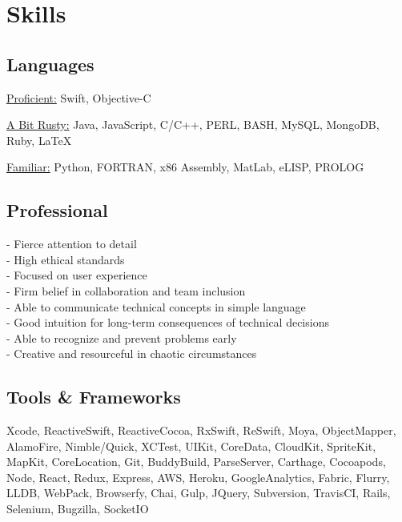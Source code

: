 \documentclass[]{jhearn-resume}
\begin{document}
\hfill
\begin{minipage}[t]{0.34\textwidth} 

\section{Skills}
\subsection{Languages}
\underline{Proficient:} Swift, Objective-C \par
\underline{A Bit Rusty:} Java, JavaScript, C/C++, PERL, BASH, MySQL, MongoDB, Ruby, { \LaTeX} \par
\underline{Familiar:} Python, FORTRAN, x86 Assembly, MatLab, eLISP, PROLOG \\
\sectionsep
\vspace{-\topsep}

\subsection{Professional}
{\raggedright - Fierce attention to detail\\
- High ethical standards\\
- Focused on user experience\\
- Firm belief in collaboration and team inclusion\\
- Able to communicate technical concepts in simple language\\
- Good intuition for long-term consequences of technical decisions\\
- Able to recognize and prevent problems early\\
- Creative and resourceful in chaotic circumstances}
\sectionsep

\subsection{Tools \& Frameworks}
\raggedright Xcode, ReactiveSwift, ReactiveCocoa, RxSwift, ReSwift, Moya, ObjectMapper, AlamoFire, Nimble/Quick, XCTest, UIKit, CoreData, CloudKit, SpriteKit, MapKit, CoreLocation, Git, BuddyBuild, ParseServer, Carthage, Cocoapods, Node, React, Redux, Express, AWS, Heroku, GoogleAnalytics, Fabric, Flurry, LLDB,  WebPack, Browserfy, Chai, Gulp, JQuery, Subversion, TravisCI, Rails, Selenium, Bugzilla, SocketIO
\sectionsep


\end{minipage}
\end{document}
